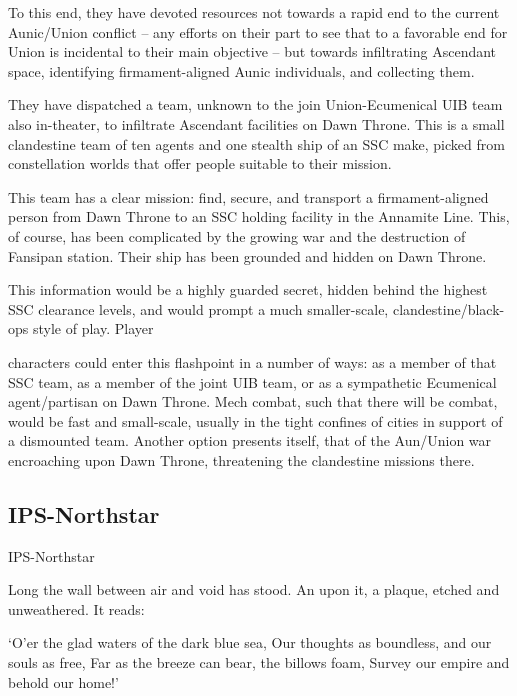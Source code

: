 To this end, they have devoted resources not towards a rapid end to the current Aunic/Union  
conflict -- any efforts on their part to see that to a favorable end for Union is incidental to their  
main objective -- but towards infiltrating Ascendant space, identifying firmament-aligned Aunic  
individuals, and collecting them. 
 

They have dispatched a team, unknown to the join Union-Ecumenical UIB team also in-theater,  
to infiltrate Ascendant facilities on Dawn Throne. This is a small clandestine team of ten agents  
and one stealth ship of an SSC make, picked from constellation worlds that offer people suitable  
to their mission. 
 

This team has a clear mission: find, secure, and transport a firmament-aligned person from Dawn  
Throne to an SSC holding facility in the Annamite Line. This, of course, has been complicated by  
the growing war and the destruction of Fansipan station. Their ship has been grounded and  
hidden on Dawn Throne. 
 

This information would be a highly guarded secret, hidden behind the highest SSC clearance  
levels, and would prompt a much smaller-scale, clandestine/black-ops style of play. Player  

                                                                                                           


characters could enter this flashpoint in a number of ways: as a member of that SSC team, as a  
member of the joint UIB team, or as a sympathetic Ecumenical agent/partisan on Dawn Throne.  
Mech combat, such that there will be combat, would be fast and small-scale, usually in the tight  
confines of cities in support of a dismounted team.  Another option presents itself, that of the  
Aun/Union war encroaching upon Dawn Throne, threatening the clandestine missions there. 
 

                                                                                                           
\subsection{IPS-Northstar}

IPS-Northstar  

                 Long the wall between air and void has stood. An upon it, a plaque, etched  
                 and unweathered. It reads:   

                         ‘O’er the glad waters of the dark blue sea,  
                         Our thoughts as boundless, and our souls as free,   
                         Far as the breeze can bear, the billows foam,   
                         Survey our empire and behold our home!’  

